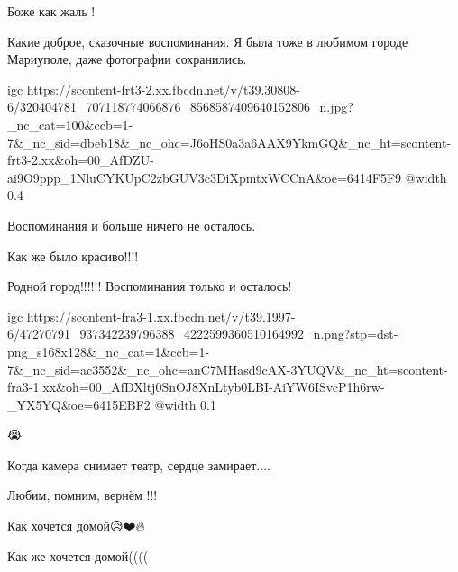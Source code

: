  
 
 
 
 

\qqSecCmt


Боже как жаль !


Какие доброе, сказочные воспоминания. Я была тоже в любимом городе Мариуполе,
даже фотографии сохранились.

\ifcmt
  igc https://scontent-frt3-2.xx.fbcdn.net/v/t39.30808-6/320404781_707118774066876_8568587409640152806_n.jpg?_nc_cat=100&ccb=1-7&_nc_sid=dbeb18&_nc_ohc=J6oHS0a3a6AAX9YkmGQ&_nc_ht=scontent-frt3-2.xx&oh=00_AfDZU-ai9O9ppp_1NluCYKUpC2zbGUV3c3DiXpmtxWCCnA&oe=6414F5F9
	@width 0.4
\fi


Воспоминания и больше ничего не осталось.


Как же было красиво!!!!


Родной город!!!!!! Воспоминания только и осталось!

\ifcmt
  igc https://scontent-fra3-1.xx.fbcdn.net/v/t39.1997-6/47270791_937342239796388_4222599360510164992_n.png?stp=dst-png_s168x128&_nc_cat=1&ccb=1-7&_nc_sid=ac3552&_nc_ohc=anC7MHasd9cAX-3YUQV&_nc_ht=scontent-fra3-1.xx&oh=00_AfDXltj0SnOJ8XnLtyb0LBI-AiYW6ISvcP1h6rw-_YX5YQ&oe=6415EBF2
	@width 0.1
\fi


😭


Когда камера снимает театр, сердце замирает....


Любим, помним, вернём !!!


Как хочется домой😥❤️🔥


Как же хочется домой((((

